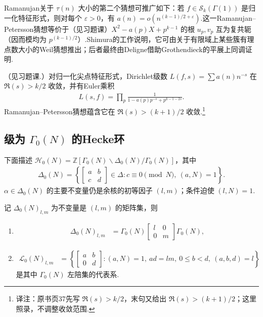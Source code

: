 \begin{remark*}

Ramanujan关于 $\tau(n)$ 大小的第二个猜想可推广如下：若 $f\in\mathcal S_k(\Gamma(1))$ 是归一化特征形式，则对每个 $\varepsilon>0$，有 $a(n)=o(n^{(k-1)/2+\varepsilon})$.这一Ramanujan--Petersson猜想等价于（见习题课）$X^2-a(p)X+p^{k-1}$ 的根 $u_p,v_p$ 互为复共轭（因而模均为 $p^{(k-1)/2}$）.Shimura的工作说明，它可由关于有限域上某些簇有理点数大小的Weil猜想推出；后者最终由Deligne借助Grothendieck的平展上同调证明.

\end{remark*}

\begin{remark*}

（见习题课.）对归一化尖点特征形式，Dirichlet级数 $L(f,s)=\sum a(n)n^{-s}$ 在 $\Re(s)>k/2$ 收敛，并有Euler乘积
\begin{align*}
L(s,f)=\prod_p\frac1{1-a(p)p^{-s}+p^{k-1-2s}}.
\end{align*}
Ramanujan--Petersson猜想蕴含它在 $\Re(s)>(k+1)/2$ 收敛.\footnote{译注：原书页37先写 $\Re(s)>k/2$，末句又给出 $\Re(s)>(k+1)/2$；这里照录，不调整收敛范围.}

\end{remark*}

\subsection{级为 \texorpdfstring{$\Gamma_0(N)$}{Γ₀(N)} 的Hecke环}\label{sec:modular-1-3-4}

下面描述 $\mathcal H_0(N)=\mathbb Z[\Gamma_0(N)\backslash\Delta_0(N)/\Gamma_0(N)]$，其中
\begin{align*}
\Delta_0(N)=\left\{\begin{bmatrix}a&b\\c&d\end{bmatrix}\in\Delta:c\equiv0\pmod N,\ (a,N)=1\right\}.
\end{align*}
$\alpha\in\Delta_0(N)$ 的主要不变量仍是余核的初等因子 $(l,m)$；条件迫使 $(l,N)=1$.

\begin{lemma*}

记 $\Delta_0(N)_{l,m}$ 为不变量是 $(l,m)$ 的矩阵集，则

\begin{enumerate}[label=\roman*)]
\item
\begin{align*}
\Delta_0(N)_{l,m}&=\Gamma_0(N)\begin{bmatrix}l&0\\0&m\end{bmatrix}\Gamma_0(N),
\end{align*}
\item
\begin{align*}
\mathcal L_0(N)_{l,m}&=\left\{\begin{bmatrix}a&b\\0&d\end{bmatrix}:(a,N)=1,\ ad=lm,\ 0\le b<d,\ (a,b,d)=l\right\}
\end{align*}
是其中 $\Gamma_0(N)$ 左陪集的代表系.
\end{enumerate}

\end{lemma*}

